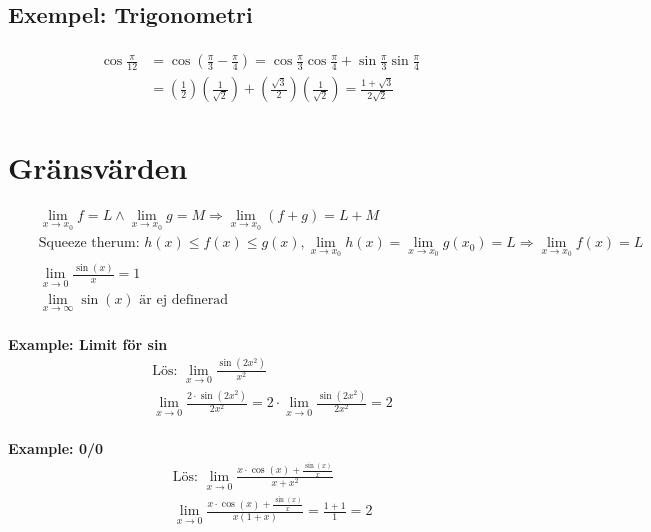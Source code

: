 \documentclass{article}
\begin{document}
\subsection{Exempel: Trigonometri}
\begin{align*}
  \begin{aligned} \cos \frac { \pi } { 12 } & = \cos \left( \frac { \pi } { 3 } - \frac { \pi } { 4 } \right) = \cos \frac { \pi } { 3 } \cos \frac { \pi } { 4 } + \sin \frac { \pi } { 3 } \sin \frac { \pi } { 4 } \\ & = \left( \frac { 1 } { 2 } \right) \left( \frac { 1 } { \sqrt { 2 } } \right) + \left( \frac { \sqrt { 3 } } { 2 } \right) \left( \frac { 1 } { \sqrt { 2 } } \right) = \frac { 1 + \sqrt { 3 } } { 2 \sqrt { 2 } } \end{aligned}
\end{align*}


\newpage


\section{Gränsvärden}
\begin{align*}
  &\quad  \lim_{x\to x_0} f = L \land \lim_{x\to x_0} g = M \Rightarrow \lim_{x\to x_0}(f+g) = L+M  \\
  &\quad  \text{Squeeze therum: } h(x) \leq f(x) \leq g(x), \lim_{x\to x_0} h(x) = \lim_{x\to x_0} g(x_0) = L
  \Rightarrow \lim_{x\to x_0} f(x) = L \\
  &\quad  \lim_{x\to 0} \frac{\sin(x)}{x}=1  \\
  &\quad  \lim_{x\to\infty} \sin(x) \text{ är ej definerad}  \\
\end{align*}


\textbf{Example: Limit för sin}
\begin{align*}
  &\quad  \text{Lös: } \lim_{x\to 0} \frac{\sin(2x^2)}{x^2}  \\
  &\quad  \lim_{x\to 0} \frac{2 \cdot \sin(2x^2)}{2x^2} = 2 \cdot \lim_{x\to 0} \frac{\sin(2x^2)}{2x^2} = 2 \\
\end{align*}

\textbf{Example: 0/0}
\begin{align*}
  &\quad  \text{Lös: } \lim_{x\to 0} \frac{x \cdot \cos(x) + \frac{\sin(x)}{x}}{x+x^2}  \\
  &\quad  \lim_{x\to 0} \frac{x \cdot \cos(x) + \frac{\sin(x)}{x}}{x(1+x)} = \frac{1+1}{1} = 2  \\
\end{align*}
\end{document}
